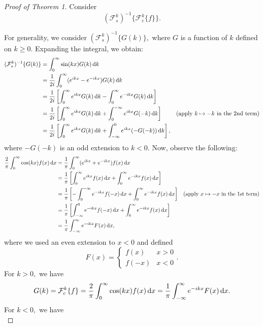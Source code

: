\documentclass[10pt,reqno,oneside,a4paper, landscape]{article}
\begin{document}
\begin{proof}[Proof of Theorem 1]
Consider
\[ 
(\mathcal{F}^k_s)^{-1} \{ \mathcal{F}^k_c \{ f \} \}.
\]

For generality, we consider $(\mathcal{F}^k_s)^{-1} \{ G(k) \},$ where $G$ is a function of $k$ defined on $k\geq 0.$ Expanding the integral, we obtain:
\begin{align*}
(\mathcal{F}^k_s)^{-1} \{ G(k) \} &= \int^{\infty}_0 \sin(kx) G(k) \,\mathrm{d} k \\
&= \frac{1}{2i} \int^{\infty}_0 (e^{ikx} - e^{-ikx}) G(k) \,\mathrm{d} k \\
&= \frac{1}{2i} \left[ \int^{\infty}_0 e^{ikx} G(k) \,\mathrm{d} k - \int^{\infty}_0 e^{-ikx} G(k) \,\mathrm{d} k\right] \\
&= \frac{1}{2i} \left[ \int^{\infty}_0 e^{ikx} G(k) \,\mathrm{d} k + \int^{-\infty}_0 e^{ikx} G(-k) \,\mathrm{d} k\right] &\text{(apply $k \mapsto - k$ in the 2nd term)} \\
&= \frac{1}{2i} \left[ \int^{\infty}_0 e^{ikx} G(k) \,\mathrm{d} k + \int_{-\infty}^0 e^{ikx} (-G(-k)) \,\mathrm{d} k\right],
\end{align*}
where $-G(-k)$ is an odd extension to $k<0$. Now, observe the following:
\begin{align*}
\frac{2}{\pi} \int^{\infty}_0 \cos(kx) f(x) \,\mathrm{d} x &=\frac{1}{\pi} \int^{\infty}_0 (e^{ikx} + e^{-ikx}) f(x) \,\mathrm{d} x \\
&= \frac{1}{\pi} \left[ \int^{\infty}_0 e^{ikx} f(x) \,\mathrm{d} x + \int^{\infty}_0 e^{-ikx} f(x) \,\mathrm{d} x \right] \\
&= \frac{1}{\pi} \left[ -\int^{-\infty}_0 e^{-ikx} f(-x) \,\mathrm{d} x  + \int^{\infty}_0 e^{-ikx} f(x) \,\mathrm{d} x  \right] &\text{(apply $x \mapsto - x$ in the 1st term)} \\
&= \frac{1}{\pi} \left[ \int_{-\infty}^0 e^{-ikx} f(-x) \,\mathrm{d} x  + \int^{\infty}_0 e^{-ikx} f(x) \,\mathrm{d} x \right] \\
&= \frac{1}{\pi} \int_{-\infty}^\infty e^{-ikx} F(x) \,\mathrm{d} x, 
\end{align*}
where we used an even extension to $x<0$ and defined
\[ 
F(x) = \begin{cases} f(x) & x>0 \\ f(-x) & x<0 \end{cases}.
\]
For $k>0,$ we have
\begin{equation}\label{G(k)}
G(k) = \mathcal{F}^k_c \{ f \} = \frac{2}{\pi} \int^{\infty}_0 \cos(kx) f(x) \,\mathrm{d} x = \frac{1}{\pi} \int_{-\infty}^\infty e^{-ikx} F(x) \,\mathrm{d} x.
\end{equation}
For $k<0,$ we have 
\begin{equation}\label{-G(-k)}

\end{equation}
\end{proof}
\end{document}
